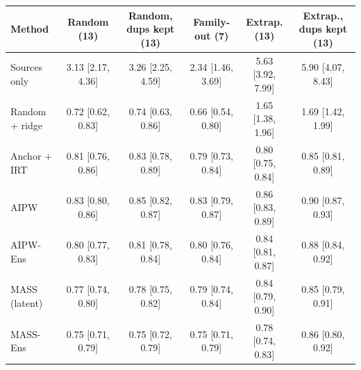 \begin{tabular}{lccccc}
\toprule
Method & Random (13) & Random, dups kept (13) & Family-out (7) & Extrap. (13) & Extrap., dups kept (13) \\
\midrule
Sources only & 3.13 [2.17, 4.36] & 3.26 [2.25, 4.59] & 2.34 [1.46, 3.69] & 5.63 [3.92, 7.99] & 5.90 [4.07, 8.43] \\
Random + ridge & 0.72 [0.62, 0.83] & 0.74 [0.63, 0.86] & 0.66 [0.54, 0.80] & 1.65 [1.38, 1.96] & 1.69 [1.42, 1.99] \\
Anchor + IRT & 0.81 [0.76, 0.86] & 0.83 [0.78, 0.89] & 0.79 [0.73, 0.84] & 0.80 [0.75, 0.84] & 0.85 [0.81, 0.89] \\
AIPW & 0.83 [0.80, 0.86] & 0.85 [0.82, 0.87] & 0.83 [0.79, 0.87] & 0.86 [0.83, 0.89] & 0.90 [0.87, 0.93] \\
AIPW-Ens & 0.80 [0.77, 0.83] & 0.81 [0.78, 0.84] & 0.80 [0.76, 0.84] & 0.84 [0.81, 0.87] & 0.88 [0.84, 0.92] \\
MASS (latent) & 0.77 [0.74, 0.80] & 0.78 [0.75, 0.82] & 0.79 [0.74, 0.84] & 0.84 [0.79, 0.90] & 0.85 [0.79, 0.91] \\
MASS-Ens & 0.75 [0.71, 0.79] & 0.75 [0.72, 0.79] & 0.75 [0.71, 0.79] & 0.78 [0.74, 0.83] & 0.86 [0.80, 0.92] \\
\bottomrule
\end{tabular}
